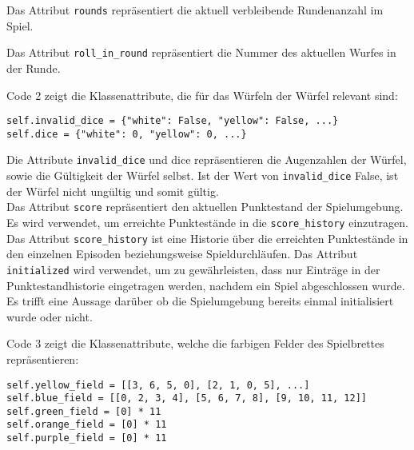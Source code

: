 Das Attribut \texttt{rounds} repräsentiert die aktuell verbleibende Rundenanzahl im Spiel.

Das Attribut \texttt{roll\_in\_round} repräsentiert die Nummer des aktuellen Wurfes in der Runde.\\

\begin{minipage}{\linewidth}
Code 2 zeigt die Klassenattribute, die für das Würfeln der Würfel relevant sind:
\vspace{0.5cm}
\begin{lstlisting}[caption={Klassenattribute für Würfel}, basicstyle=\ttfamily]
self.invalid_dice = {"white": False, "yellow": False, ...}
self.dice = {"white": 0, "yellow": 0, ...}
\end{lstlisting}
\end{minipage}

Die Attribute \texttt{invalid\_dice} und dice repräsentieren die Augenzahlen der Würfel, sowie die Gültigkeit der Würfel selbst. Ist der Wert von \texttt{invalid\_dice} False, ist der Würfel nicht ungültig und somit gültig.\\

Das Attribut \texttt{score} repräsentiert den aktuellen Punktestand der Spielumgebung. Es wird verwendet, um erreichte Punktestände in die \texttt{score\_history} einzutragen. Das Attribut \texttt{score\_history} ist eine Historie über die erreichten Punktestände in den einzelnen Episoden beziehungsweise Spieldurchläufen. Das Attribut \texttt{initialized} wird verwendet, um zu gewährleisten, dass nur Einträge in der Punktestandhistorie eingetragen werden, nachdem ein Spiel abgeschlossen wurde. Es trifft eine Aussage darüber ob die Spielumgebung bereits einmal initialisiert wurde oder nicht.\\

\begin{minipage}{\linewidth}
Code 3 zeigt die Klassenattribute, welche die farbigen Felder des Spielbrettes repräsentieren:
\vspace{0.5cm}
\begin{lstlisting}[caption={Klassenattribute für die farbigen Felder des Spiels}, basicstyle=\ttfamily]
self.yellow_field = [[3, 6, 5, 0], [2, 1, 0, 5], ...]
self.blue_field = [[0, 2, 3, 4], [5, 6, 7, 8], [9, 10, 11, 12]]
self.green_field = [0] * 11
self.orange_field = [0] * 11
self.purple_field = [0] * 11
\end{lstlisting}
\end{minipage}

